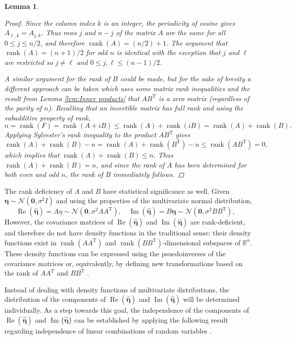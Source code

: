 \documentclass[12pt]{article}
\newcommand{\trans}{\mathrm{T}}	%
\newcommand{\rank}{\operatorname{rank}}	%
\newcommand{\noise}{\eta}	%
\newcommand{\noiseSD}{\sigma}	%
\newcommand{\noiseVec}{\bm{\noise}}	%
\renewcommand{\Re}{\operatorname{Re}}	%
\renewcommand{\Im}{\operatorname{Im}}	%
\newtheorem{lemma}{Lemma}[section]
\begin{document}
\begin{lemma}
\begin{proof}
Since the column index $k$ is an integer, the periodicity of cosine gives $A_{\ell,{k}} = A_{j,k}$. Thus rows $j$ and $n-j$ of the matrix $A$ are the same for all $0 \leq j \leq n/2$, and therefore $\rank(A) = (n/2)+1$.  The argument that $\rank(A) = (n+1)/2$ for odd $n$ is identical with the exception that $j$ and $\ell$ are restricted so $j \neq \ell$ and $0 \leq j,\ell \leq (n-1)/2$. \par 
A similar argument for the rank of $B$ could be made, but for the sake of brevity a different approach can be taken which uses some matrix rank inequalities and  the result from Lemma \ref{lem:Inner products} that $AB^\trans$ is a zero matrix (regardless of the parity of $n$). Recalling that an invertible matrix has full rank and using the subadditive property of rank,
\[n = \rank(F) = \rank(A + iB) \leq \rank(A) + \rank(iB) = \rank(A) + \rank(B).\] 
Applying Sylvester's rank inequality to the product $AB^\trans$ gives
\[\rank(A) + \rank(B) - n = \rank(A) + \rank(B^\trans) - n \leq \rank(AB^\trans) = 0,\]
which implies that $\rank(A) + \rank(B) \leq n$. Thus $\rank(A) + \rank(B) = n$, and since the rank of $A$ has been determined for both even and odd $n$, the rank of $B$ immediately follows. 
\end{proof}
\end{lemma} 

The rank deficiency of $A$ and $B$ have statistical significance as well.  Given $\noiseVec \sim \mathcal{N}(\bm{0},\noiseSD^2I)$ and using the properties of the multivariate normal distribution, 
\begin{equation}
\Re(\widehat{\noiseVec}) = A\noise \sim \mathcal{N}(\bm{0},\noiseSD^2 AA^\trans), \quad \Im(\widehat{\noiseVec}) = B\noiseVec \sim \mathcal{N}(\bm{0},\noiseSD^2 BB^\trans), \quad
\label{eq:Real and imaginary distributions}
\end{equation}
However, the covariance matrices of $\Re(\widehat{\noiseVec})$ and $\Im(\widehat{\noiseVec})$ are rank-deficient, and therefore do not have density functions in the traditional sense; their density functions exist in $\rank(AA^\trans)$ and $\rank(BB^\trans)$-dimensional subspaces of $\mathbb{R}^n$. These density functions can be expressed using the psuedoinverses of the covariance matrices or, equivalently, by defining new transformations based on the rank of $AA^\trans$ and $BB^\trans$ \cite[p.~527-528]{Rao1973}. \par 
Instead of dealing with density functions of multivariate distributions, the distribution of the components of $\Re(\widehat{\noiseVec})$ and $\Im(\widehat{\noiseVec})$ will be determined individually. As a step towards this goal, the independence of the components of $\Re(\widehat{\noiseVec})$ and $\Im\{\widehat{\noiseVec}\}$ can be established by applying the following result regarding independence of linear combinations of random variables \cite{LukacsKing}.
\end{document}
